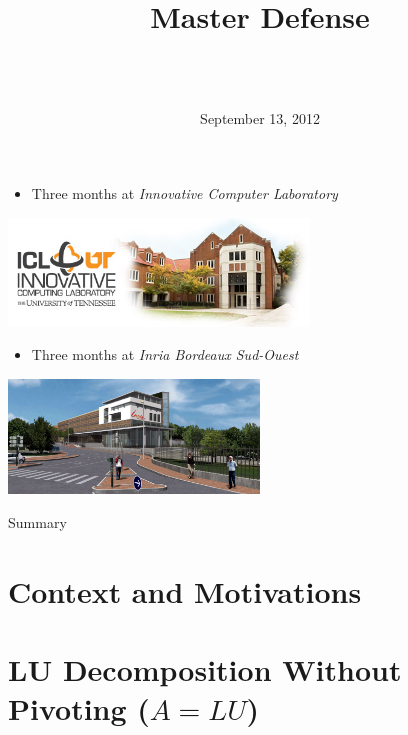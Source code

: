 \documentclass{beamer}
\title[Enabling Partial Pivoting in Task Flow LU Factorization]{
        {\bfseries \projet\\} 
        {\bfseries \huge \sujet}
        {\small Master Defense}
}
\date{September 13, 2012}
\author[Zenati]{
  {\normalsize \bfseries \sffamily} {\large \gA}\\
  \vspace{1cm}
  {\normalsize \bfseries \sffamily} {\large \gB}\\
}
\begin{document}
\begin{frame}
\maketitle
\end{frame}

\begin{frame}
\begin{itemize}
\item Three months at \textit{Innovative Computer Laboratory}
\end{itemize}
\begin{center}
\includegraphics[width=0.6\textwidth]{icl-claxton.jpg}
\end{center}
\begin{itemize}
\item Three months at \textit{Inria Bordeaux Sud-Ouest}
\end{itemize}
\begin{center}
\includegraphics[width=0.5\textwidth]{bandeau-home-bordeaux.jpg}
\end{center}
\end{frame}

\begin{frame}{Summary}
\tableofcontents
\end{frame}

\section[Context]{Context and Motivations}


\section[Without Pivoting]{LU Decomposition Without Pivoting ($A=LU$)}

\end{document}

